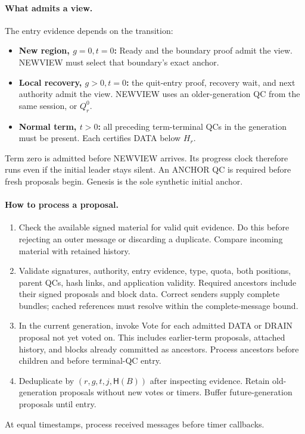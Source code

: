 \documentclass[11pt,a4paper]{article}
\newcommand{\Hash}{\mathsf H}
\begin{document}
\paragraph{What admits a view.}
The entry evidence depends on the transition:
\begin{itemize}
\item \textbf{New region, $g=0,t=0$:} Ready and the boundary proof admit
the view. NEWVIEW must select that boundary's exact anchor.
\item \textbf{Local recovery, $g>0,t=0$:} the quit-entry proof, recovery
wait, and next authority admit the view.
NEWVIEW uses an older-generation QC from the same session, or $Q_r^0$.
\item \textbf{Normal term, $t>0$:} all preceding term-terminal QCs in
the generation must be present. Each certifies DATA below $H_r$.
\end{itemize}
Term zero is admitted before NEWVIEW arrives.
Its progress clock therefore runs even if the initial leader stays silent.
An ANCHOR QC is required before fresh proposals begin.
Genesis is the sole synthetic initial anchor.

\paragraph{How to process a proposal.}
\begin{enumerate}[label=(\roman*),itemsep=2pt]
\item Check the available signed material for valid quit evidence.
Do this before rejecting an outer message or discarding a duplicate.
Compare incoming material with retained history.
\item Validate signatures, authority, entry evidence, type, quota,
both positions, parent QCs, hash links, and application validity.
Required ancestors include their signed proposals and block data.
Correct senders supply complete bundles; cached references must resolve
within the complete-message bound.
\item In the current generation, invoke Vote for each admitted DATA or
DRAIN proposal not yet voted on. This includes earlier-term proposals,
attached history, and blocks already committed as ancestors.
Process ancestors before children and before terminal-QC entry.
\item Deduplicate by $(r,g,t,j,\Hash(B))$ after inspecting evidence.
Retain old-generation proposals without new votes or timers.
Buffer future-generation proposals until entry.
\end{enumerate}
At equal timestamps, process received messages before timer callbacks.
\end{document}
